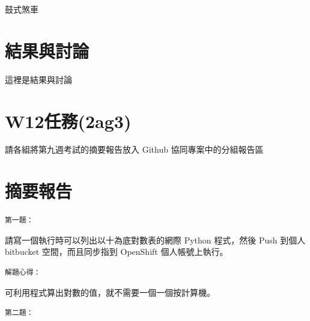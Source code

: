 \documentclass[]{article}
\newenvironment{Shaded}{}{}
\newcommand{\KeywordTok}[1]{\textcolor[rgb]{0.00,0.44,0.13}{\textbf{{#1}}}}
\newcommand{\DataTypeTok}[1]{\textcolor[rgb]{0.56,0.13,0.00}{{#1}}}
\newcommand{\DecValTok}[1]{\textcolor[rgb]{0.25,0.63,0.44}{{#1}}}
\newcommand{\CharTok}[1]{\textcolor[rgb]{0.25,0.44,0.63}{{#1}}}
\newcommand{\StringTok}[1]{\textcolor[rgb]{0.25,0.44,0.63}{{#1}}}
\newcommand{\OtherTok}[1]{\textcolor[rgb]{0.00,0.44,0.13}{{#1}}}
\newcommand{\NormalTok}[1]{{#1}}
\begin{document}
鼓式煞車

\section{結果與討論}\label{ux7d50ux679cux8207ux8a0eux8ad6}

這裡是結果與討論

\section{W12任務(2ag3)}\label{w12ux4efbux52d92ag3}

請各組將第九週考試的摘要報告放入 Github 協同專案中的分組報告區

\section{摘要報告}\label{ux6458ux8981ux5831ux544a}

\begin{verbatim}
第一題：
\end{verbatim}

請寫一個執行時可以列出以十為底對數表的網際 Python 程式，然後 Push 到個人
bitbucket 空間，而且同步指到 OpenShift 個人帳號上執行。

\begin{Shaded}
\end{Shaded}

\begin{verbatim}
解題心得：
\end{verbatim}

可利用程式算出對數的值，就不需要一個一個按計算機。

\begin{verbatim}
第二題：
\end{verbatim}
\end{document}
